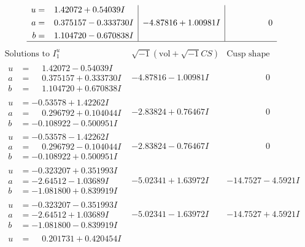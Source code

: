 \documentclass[1p]{elsarticle_modified}
\theoremstyle{definition}
\newcommand{\I}{\sqrt{-1}}
\begin{document}
$$\begin{array}{c|c|c}
\begin{aligned}
u &= \phantom{-}1.42072 + 0.54039 I \\
a &= \phantom{-}0.375157 - 0.333730 I \\
b &= \phantom{-}1.104720 - 0.670838 I\end{aligned}
 & -4.87816 + 1.00981 I & \phantom{-0.000000 } 0\\
 \hline 
 \end{array}$$\newpage$$\begin{array}{c|c|c}  
\text{Solutions to }I^u_{1}& \I (\text{vol} + \sqrt{-1}CS) & \text{Cusp shape}\\
 \hline 
\begin{aligned}
u &= \phantom{-}1.42072 - 0.54039 I \\
a &= \phantom{-}0.375157 + 0.333730 I \\
b &= \phantom{-}1.104720 + 0.670838 I\end{aligned}
 & -4.87816 - 1.00981 I & \phantom{-0.000000 } 0 \\ \hline\begin{aligned}
u &= -0.53578 + 1.42262 I \\
a &= \phantom{-}0.296792 + 0.104044 I \\
b &= -0.108922 - 0.500951 I\end{aligned}
 & -2.83824 + 0.76467 I & \phantom{-0.000000 } 0 \\ \hline\begin{aligned}
u &= -0.53578 - 1.42262 I \\
a &= \phantom{-}0.296792 - 0.104044 I \\
b &= -0.108922 + 0.500951 I\end{aligned}
 & -2.83824 - 0.76467 I & \phantom{-0.000000 } 0 \\ \hline\begin{aligned}
u &= -0.323207 + 0.351993 I \\
a &= -2.64512 - 1.03689 I \\
b &= -1.081800 + 0.839919 I\end{aligned}
 & -5.02341 + 1.63972 I & -14.7527 - 4.5921 I \\ \hline\begin{aligned}
u &= -0.323207 - 0.351993 I \\
a &= -2.64512 + 1.03689 I \\
b &= -1.081800 - 0.839919 I\end{aligned}
 & -5.02341 - 1.63972 I & -14.7527 + 4.5921 I \\ \hline\begin{aligned}
u &= \phantom{-}0.201731 + 0.420454 I \\

\end{aligned}
\end{array}$$
\end{document}
